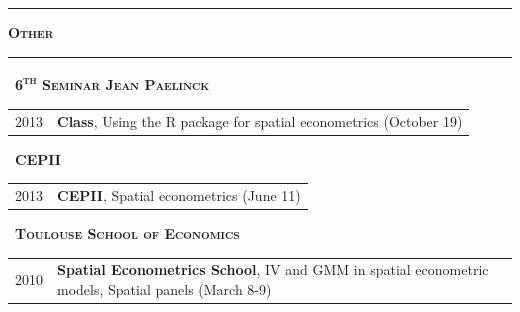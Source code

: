 \documentclass[a4paper,12pt]{article}
\newcommand{\titre}[1]{%
	\bigskip
	\noindent \rule[2mm]{\textwidth}{0.5pt}
	\textbf{\textsc{\large #1}} \\
	\noindent \rule[1mm]{\textwidth}{0.5pt}
	}
\newcommand{\smalltitre}[1]{%
	\noindent \textbullet~\textsc{\textbf{#1}}
	\smallskip
	}
\begin{document}
\titre{Other}

\smalltitre{6\textsuperscript{th} Seminar Jean Paelinck}

\noindent \begin{longtable}{@{}p{\annee}p{\texte}@{}}
2013 & \textbf{Class}, \og{}Using the R package for spatial econometrics\fg{} (October 19) \\
\end{longtable}

\smalltitre{CEPII}

\noindent \begin{longtable}{@{}p{\annee}p{\texte}@{}}
2013 & \textbf{CEPII}, \og{}Spatial econometrics\fg{} (June 11) \\
\end{longtable}

\smalltitre{Toulouse School of Economics}

\noindent \begin{longtable}{@{}p{\annee}p{\texte}@{}}
2010 & \textbf{Spatial Econometrics School}, \og{}IV and GMM in spatial econometric models\fg{}, \og{}Spatial panels\fg{} (March 8-9) \\
\end{longtable}
\end{document}
